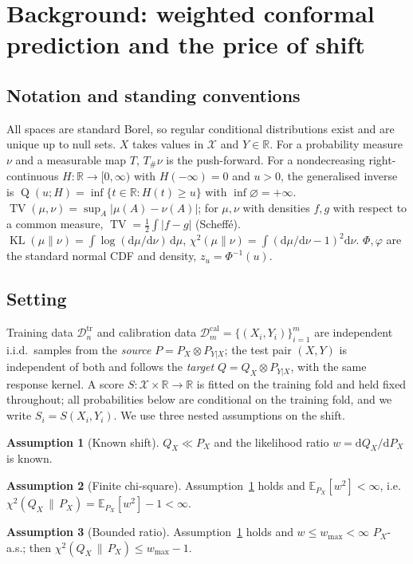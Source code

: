 \documentclass[11pt,a4paper]{article}
\newcommand{\PX}{P_X}
\newcommand{\QX}{Q_X}
\newcommand{\chisq}{\chi^2(\QX\,\|\,\PX)}
\newcommand{\E}{\mathbb{E}}
\newcommand{\R}{\mathbb{R}}
\newcommand{\TV}{\operatorname{TV}}
\newcommand{\KL}{\operatorname{KL}}
\DeclareMathOperator{\Qf}{Q}
\theoremstyle{plain}
\theoremstyle{definition}
\newtheorem{assumption}{Assumption}
\theoremstyle{remark}
\begin{document}
\section{Background: weighted conformal prediction and the price of shift}\label{sec:background}

\subsection{Notation and standing conventions}

All spaces are standard Borel, so regular conditional distributions exist and are unique up to null sets. $X$ takes values in $\mathcal X$ and $Y\in\R$. For a probability measure $\nu$ and a measurable map $T$, $T_\#\nu$ is the push-forward. For a nondecreasing right-continuous $H:\R\to[0,\infty)$ with $H(-\infty)=0$ and $u>0$, the generalised inverse is $\Qf(u;H)=\inf\{t\in\R:H(t)\ge u\}$ with $\inf\varnothing=+\infty$. $\TV(\mu,\nu)=\sup_A|\mu(A)-\nu(A)|$; for $\mu,\nu$ with densities $f,g$ with respect to a common measure, $\TV=\tfrac12\int|f-g|$ (Scheff\'e). $\KL(\mu\|\nu)=\int\log(\mathrm d\mu/\mathrm d\nu)\,\mathrm d\mu$, $\chi^2(\mu\|\nu)=\int(\mathrm d\mu/\mathrm d\nu-1)^2\mathrm d\nu$. $\Phi,\varphi$ are the standard normal CDF and density, $z_u=\Phi^{-1}(u)$.

\subsection{Setting}

Training data $\mathcal D^{\mathrm{tr}}_n$ and calibration data $\mathcal D^{\mathrm{cal}}_m=\{(X_i,Y_i)\}_{i=1}^m$ are independent i.i.d.\ samples from the \emph{source} $P=\PX\otimes P_{Y|X}$; the test pair $(X,Y)$ is independent of both and follows the \emph{target} $Q=\QX\otimes P_{Y|X}$, with the same response kernel. A score $S:\mathcal X\times\R\to\R$ is fitted on the training fold and held fixed throughout; all probabilities below are conditional on the training fold, and we write $S_i=S(X_i,Y_i)$. We use three nested assumptions on the shift.

\begin{assumption}[Known shift]\label{ass:L}
$\QX\ll\PX$ and the likelihood ratio $w=\mathrm d\QX/\mathrm d\PX$ is known.
\end{assumption}
\begin{assumption}[Finite chi-square]\label{ass:chi}
Assumption~\ref{ass:L} holds and $\E_{\PX}[w^2]<\infty$, i.e.\ $\chisq=\E_{\PX}[w^2]-1<\infty$.
\end{assumption}
\begin{assumption}[Bounded ratio]\label{ass:bdd}
Assumption~\ref{ass:L} holds and $w\le w_{\max}<\infty$ $\PX$-a.s.; then $\chisq\le w_{\max}-1$.
\end{assumption}
\end{document}
